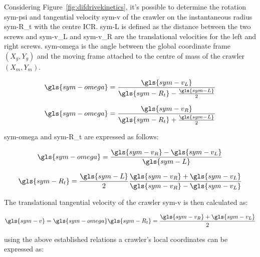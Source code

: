 Considering Figure~\ref{fig:difdrivekinetics}, it's possible to determine the rotation \gls{sym-psi} and tangential
velocity \gls{sym-v} of the crawler on the instantaneous radius \gls{sym-R_t} with the centre ICR. \gls{sym-L} is
defined as the distance between the two screws and \gls{sym-v_L} and \gls{sym-v_R} are the translational velocities for
the left and right screws. \gls{sym-omega} is the angle between the global coordinate frame \( (X_g, Y_g) \) and the
moving frame attached to the centre of mass of the crawler \( (X_m, Y_m) \).

\begin{equation}
    \label{eg:left}
    \gls{sym-omega} = \frac{\gls{sym-v_L}}{\gls{sym-R_t} - \frac{\gls{sym-L}}{2}}
\end{equation}

\begin{equation}
    \label{eg:right}
    \gls{sym-omega} = \frac{\gls{sym-v_R}}{\gls{sym-R_t} + \frac{\gls{sym-L}}{2}}
\end{equation}

\noindent \gls{sym-omega} and \gls{sym-R_t} are expressed as follows:

\begin{equation}
    \label{eq:omega_t}
    \gls{sym-omega} = \frac{\gls{sym-v_R} - \gls{sym-v_L}}{\gls{sym-L}}
\end{equation}

\begin{equation}
    \label{eq:R_t}
    \gls{sym-R_t} = \frac{\gls{sym-L}}{2}\frac{\gls{sym-v_R} + \gls{sym-v_L}}{\gls{sym-v_R} - \gls{sym-v_L}}
\end{equation}

\noindent The translational tangential velocity of the crawler \gls{sym-v} is then calculated as:

\begin{equation}
    \label{eq:v_crawler}
    \gls{sym-v} = \gls{sym-omega} \gls{sym-R_t} = \frac{\gls{sym-v_R} + \gls{sym-v_L}}{2}
\end{equation}

\noindent using the above established relations a crawler's local coordinates can be expressed as:

